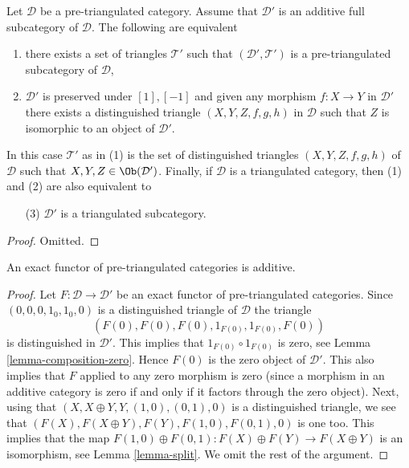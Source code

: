 \begin{lemma}
\label{lemma-triangulated-subcategory}
Let $\mathcal{D}$ be a pre-triangulated category.
Assume that $\mathcal{D}'$ is an additive full subcategory of $\mathcal{D}$.
The following are equivalent
\begin{enumerate}
\item there exists a set of triangles $\mathcal{T}'$ such that
$(\mathcal{D}', \mathcal{T}')$ is a pre-triangulated subcategory
of $\mathcal{D}$,
\item $\mathcal{D}'$ is preserved under $[1], [-1]$ and
given any morphism $f : X \to Y$ in $\mathcal{D}'$ there exists
a distinguished triangle $(X, Y, Z, f, g, h)$ in $\mathcal{D}$
such that $Z$ is isomorphic to an object of $\mathcal{D}'$.
\end{enumerate}
In this case $\mathcal{T}'$ as in (1) is the set of distinguished triangles
$(X, Y, Z, f, g, h)$ of $\mathcal{D}$ such that
$X, Y, Z \in \Ob(\mathcal{D}')$. Finally, if $\mathcal{D}$
is a triangulated category, then (1) and (2) are also equivalent to
\begin{enumerate}
\item[(3)] $\mathcal{D}'$ is a triangulated subcategory.
\end{enumerate}
\end{lemma}

\begin{proof}
Omitted.
\end{proof}

\begin{lemma}
\label{lemma-exact-functor-additive}
An exact functor of pre-triangulated categories is additive.
\end{lemma}

\begin{proof}
Let $F : \mathcal{D} \to \mathcal{D}'$ be an exact functor of
pre-triangulated categories. Since
$(0, 0, 0, 1_0, 1_0, 0)$ is a distinguished triangle of $\mathcal{D}$
the triangle
$$
(F(0), F(0), F(0), 1_{F(0)}, 1_{F(0)}, F(0))
$$
is distinguished in $\mathcal{D}'$.
This implies that $1_{F(0)} \circ 1_{F(0)}$ is zero, see
Lemma \ref{lemma-composition-zero}.
Hence $F(0)$ is the zero object of $\mathcal{D}'$. This also implies
that $F$ applied to any zero morphism is zero (since a morphism in
an additive category is zero if and only if it factors through the
zero object). Next, using that
$(X, X \oplus Y, Y, (1, 0), (0, 1), 0)$ is a distinguished triangle,
we see that $(F(X), F(X \oplus Y), F(Y), F(1, 0), F(0, 1), 0)$ is
one too. This implies that the map
$F(1, 0) \oplus F(0, 1) : F(X) \oplus F(Y) \to F(X \oplus Y)$
is an isomorphism, see
Lemma \ref{lemma-split}.
We omit the rest of the argument.
\end{proof}

